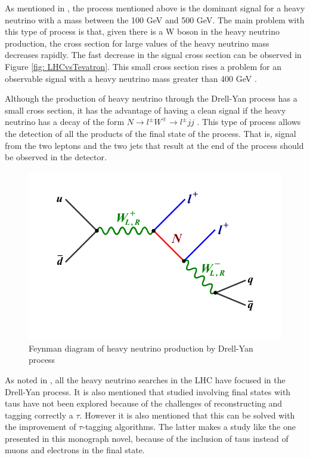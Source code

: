 As mentioned in \cite{HNDrell-Yan}, the process mentioned above is the dominant signal for a heavy neutrino with a mass between the 100 GeV and 500 GeV. The main problem with this type of process is that, given there is a W boson in the heavy neutrino production, the cross section for large values of the heavy neutrino mass decreases rapidly. The fast decrease in the signal cross section can be observed in Figure \ref{fig: LHCvsTevatron}. This small cross section rises a problem for an observable signal with a heavy neutrino mass greater than 400 GeV \cite{HNDrell-Yan}.

Although the production of heavy neutrino through the Drell-Yan process has a small cross section, it has the advantage of having a clean signal if the heavy neutrino has a decay of the form $N \rightarrow l^{\pm} W^{\mp} \rightarrow l^{\pm} jj$ \cite{HNDrell-Yan}. This type of process allows the detection of all the products of the final state of the process. That is, signal from the two leptons and the two jets that result at the end of the process should be observed in the detector. 

\begin{figure}[H]
\centering
\includegraphics[width=\linewidth]{Feynman_HN_DY}
\caption{Feynman diagram of heavy neutrino production by Drell-Yan process}
\label{fig: HN_DY}
\end{figure}

As noted in \cite{See-saw}, all the heavy neutrino searches in the LHC have focused in the Drell-Yan process. It is also mentioned that studied involving final states with taus have not been explored because of the challenges of reconstructing and tagging correctly a $\tau$. However it is also mentioned that this can be solved with the improvement of $\tau$-tagging algorithms. The latter makes a study like the one presented in this monograph novel, because of the inclusion of taus instead of muons and electrons in the final state.   

